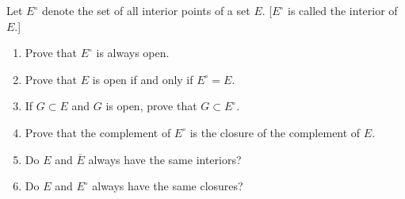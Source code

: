 \documentclass[12pt]{article}
\newenvironment{problem}[2][Exercise]{\begin{trivlist}
\item[\hskip \labelsep {\bfseries #1}\hskip \labelsep {\bfseries #2.}]}{\end{trivlist}}
\begin{document}
\begin{problem}{2.9}
Let $E^{\circ}$ denote the set of all interior points of a set $E$. [$E^{\circ}$ is called the interior of $E$.]
\begin{enumerate}[label=(\alph*)]
	\item Prove that $E^{\circ}$ is always open.
	\item Prove that $E$ is open if and only if $E^{\circ} = E$.
	\item If $G\subset E$ and $G$ is open, prove that $G\subset E^{\circ}$.
	\item Prove that the complement of $E^{\circ}$ is the closure of the complement of $E$.
	\item Do $E$ and $\overline{E}$ always have the same interiors?
	\item Do $E$ and $E^{\circ}$ always have the same closures?
\end{enumerate}
\end{problem}
\end{document}
